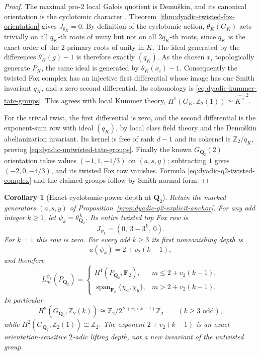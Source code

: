 \documentclass[11pt]{article}
\newtheorem{corollary}[theorem]{Corollary}
\theoremstyle{definition}
\begin{document}
\begin{proof}
The maximal pro-$2$ local Galois quotient
is Demu\v{s}kin, and its canonical orientation
is the cyclotomic character
\cite{LabuteClassification,NSW}.
Theorem~\ref{thm:dyadic-twisted-fox-orientation}
gives $J_{\theta_K}=0$.
By definition of the cyclotomic action,
$\theta_K(G_K)$ acts trivially on all $q_K$-th
roots of unity but not on all $2q_K$-th
roots, since $q_K$ is the exact order
of the $2$-primary roots of unity in $K$.
The ideal generated by the differences
$\theta_K(g)-1$ is therefore exactly $(q_K)$.
As the chosen $x_i$ topologically generate
$P_K$, the same ideal is generated by
$\theta_K(x_i)-1$.
Consequently the twisted Fox complex has
an injective first differential whose image
has one Smith invariant $q_K$, and a zero
second differential.  Its cohomology is
\eqref{eq:dyadic-kummer-tate-groups}.
This agrees with local Kummer theory,
$H^1(G_K,\mathbb Z_2(1))
\simeq\widehat{K^\times}^{\,2}$.

For the trivial twist, the first differential
is zero, and the second differential is
the exponent-sum row with ideal $(q_K)$,
by local class field theory and the
Demu\v{s}kin abelianization invariant.
Its kernel is free of rank $d-1$ and its
cokernel is $\mathbb Z_2/q_K$, proving
\eqref{eq:dyadic-untwisted-tate-groups}.
Finally the known $G_{\mathbf Q_2}(2)$
orientation takes values $(-1,1,-1/3)$
on $(a,s,y)$; subtracting $1$ gives
$(-2,0,-4/3)$, and its twisted Fox row
vanishes.  Formula
\eqref{eq:dyadic-q2-twisted-complex}
and the claimed groups follow by Smith
normal form.
\end{proof}

\begin{corollary}[Exact cyclotomic-power depth at $\mathbf Q_2$]
\label{cor:dyadic-q2-cyclotomic-power-depth}
Retain the marked generators $(a,s,y)$ of
Proposition~\ref{prop:dyadic-q2-explicit-anchor}.
For any odd integer $k\ge1$, let
$\psi_k=\theta_{\mathbf Q_2}^{\,k}$.  Its entire
twisted top Fox row is
\begin{equation}\label{eq:dyadic-q2-cyclotomic-power-row}
J_{\psi_k}=(0,\ 3-3^k,\ 0).
\end{equation}
For $k=1$ this row is zero.  For every odd
$k\ge3$ its first nonvanishing depth is
\[
a(\psi_k)=2+v_2(k-1),
\]
and therefore
\begin{equation}\label{eq:dyadic-q2-cyclotomic-power-lifting}
L_m^{\psi_k}(P_{\mathbf Q_2})=
\begin{cases}
H^1(P_{\mathbf Q_2},\mathbf F_2),
 &m\le 2+v_2(k-1),\\
\operatorname{span}_{\mathbf F_2}
   \{\chi_a,\chi_y\},
 &m>2+v_2(k-1).
\end{cases}
\end{equation}
In particular
\[
H^2(G_{\mathbf Q_2},\mathbb Z_2(k))
\cong \mathbb Z_2/2^{\,2+v_2(k-1)}\mathbb Z_2
\qquad(k\ge3\text{ odd}),
\]
while $H^2(G_{\mathbf Q_2},\mathbb Z_2(1))
\cong\mathbb Z_2$.
The exponent $2+v_2(k-1)$ is an exact
orientation-sensitive $2$-adic lifting depth,
not a new invariant of the untwisted group.
\end{corollary}
\end{document}
